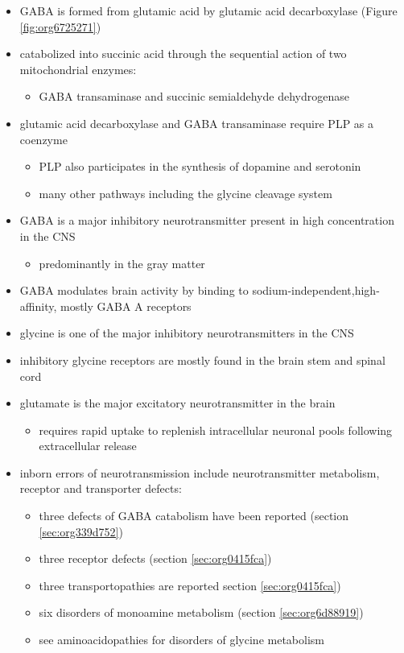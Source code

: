 \documentclass{scrartcl}
\begin{document}
\begin{itemize}
\item GABA is formed from glutamic acid by glutamic acid decarboxylase
(Figure \ref{fig:org6725271})
\item catabolized into succinic acid through the sequential action of two
mitochondrial enzymes:
\begin{itemize}
\item GABA transaminase and succinic semialdehyde dehydrogenase
\end{itemize}
\item glutamic acid decarboxylase and GABA transaminase require PLP as a coenzyme
\begin{itemize}
\item PLP also participates in the synthesis of dopamine and serotonin
\item many other pathways including the glycine cleavage system
\end{itemize}
\item GABA is a major inhibitory neurotransmitter present in high
concentration in the CNS
\begin{itemize}
\item predominantly in the gray matter
\end{itemize}
\item GABA modulates brain activity by binding to
sodium-independent,high-affinity, mostly GABA A receptors
\item glycine is one of the major inhibitory neurotransmitters in the CNS
\item inhibitory glycine receptors are mostly found in the brain stem
and spinal cord
\item glutamate is the major excitatory neurotransmitter in the brain
\begin{itemize}
\item requires rapid uptake to replenish intracellular
neuronal pools following extracellular release
\end{itemize}
\item inborn errors of neurotransmission include neurotransmitter
metabolism, receptor and transporter defects:
\begin{itemize}
\item three defects of GABA catabolism have been reported (section \ref{sec:org339d752})
\item three receptor defects (section \ref{sec:org0415fca})
\item three transportopathies are reported section \ref{sec:org0415fca})
\item six disorders of monoamine metabolism (section \ref{sec:org6d88919})
\item see aminoacidopathies for disorders of glycine metabolism
\end{itemize}
\end{itemize}
\end{document}
